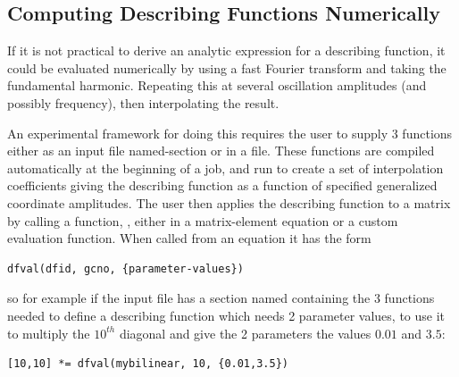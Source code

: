 

\subsection{Computing Describing Functions Numerically}
\label{sect:computing-df}
If it is not practical to derive an analytic expression for a
describing function, it could be evaluated numerically by using
a fast Fourier transform and taking the fundamental harmonic.
Repeating this at several oscillation amplitudes (and possibly
frequency), then interpolating the result.

An experimental framework for doing this requires the user to supply
3 functions either as an input file named-section  or
in a file. These functions are compiled automatically at the beginning
of a \Fina job, and run to create a set of interpolation coefficients
giving the describing function as a function of specified generalized
coordinate amplitudes. The user then applies the describing function
to a matrix by calling a \Fina function, , either in
a matrix-element equation or a custom evaluation function. When called
from an equation it has the form
\begin{lstlisting}
dfval(dfid, gcno, {parameter-values})
\end{lstlisting}
so for example if the input file has a section named 
containing the 3 functions needed to define a describing function which
needs 2 parameter values, to use it to multiply the $10^{th}$ diagonal
and give the 2 parameters the values $0.01$ and $3.5$:
\begin{lstlisting}
[10,10] *= dfval(mybilinear, 10, {0.01,3.5})
\end{lstlisting}

